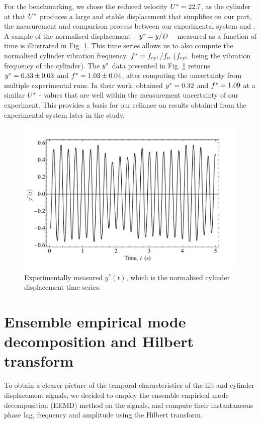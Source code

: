 \documentclass[oneside]{utmthesis}
\begin{document}
For the benchmarking, we chose the reduced velocity $U^{*} = 22.7$, as the cylinder at that $U^{*}$ produces a large and stable displacement that simplifies on our part, the measurement and comparison process between our experimental system and \citet{Koide2013}. A sample of the normalised displacement -- $y^{*} = y/D$ -- measured as a function of time is illustrated in Fig. \ref{fig:sampTimeHist}. This time series allows us to also compute the normalised cylinder vibration frequency, $f^{*} = f_{\text{cyl.}}/f_{n}$ ($f_{\text{cyl.}}$ being the vibration frequency of the cylinder). The $y^{*}$ data presented in Fig. \ref{fig:sampTimeHist} returns $y^{*} = 0.33 \pm 0.03$ and $f^{*} = 1.03 \pm 0.04$, after computing the uncertainty from multiple experimental runs. In their work, \citet{Koide2013} obtained $y^{*} = 0.32$ and $f^{*} = 1.09$ at a similar $U^{*}$ - values that are well within the measurement uncertainty of our experiment. This provides a basis for our reliance on results obtained from the experimental system later in the study.

\begin{figure}
  \centering
  \includegraphics[width=1\textwidth]{figs/figure5}
  \caption{Experimentally measured $y^{*}(t)$, which is the normalised cylinder displacement time series.}
  \label{fig:sampTimeHist}
\end{figure}

\section{Ensemble empirical mode decomposition and Hilbert transform} \label{sec:eemd}
To obtain a clearer picture of the temporal characteristics of the lift and cylinder displacement signals, we decided to employ the ensemble empirical mode decomposition (EEMD) method \citep{Huang1998,Wu2008} on the signals, and compute their instantaneous phase lag, frequency and amplitude using the Hilbert transform.
\end{document}
